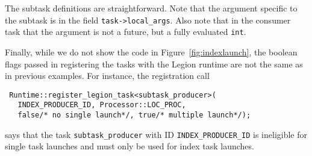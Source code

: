 The subtask definitions are straightforward.  Note that the argument specific to the subtask is
in the field {\tt task->local\_args}.  Also note that in the consumer task that 
the argument is not a future, but a fully evaluated {\tt int}.

Finally, while we do not show the code in Figure~\ref{fig:indexlaunch}, the boolean
flags passed in registering the tasks with the Legion runtime are not the same as in
previous examples.  For instance, the registration call
\begin{verbatim}
 Runtime::register_legion_task<subtask_producer>(
   INDEX_PRODUCER_ID, Processor::LOC_PROC, 
   false/* no single launch*/, true/* multiple launch*/);
\end{verbatim}
says that the task {\tt subtask\_producer} with ID {\tt INDEX\_PRODUCER\_ID} is ineligible for
single task launches and must only be used for index task launches.



